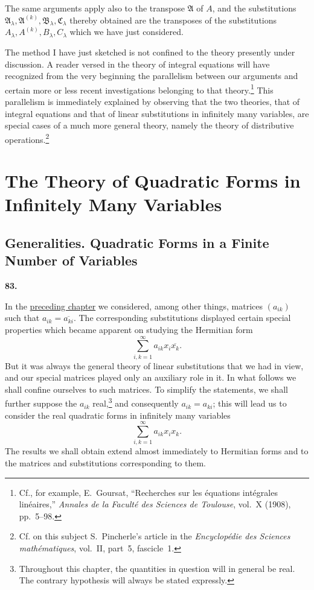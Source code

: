 \documentclass[
  paper=b5,
  fontsize=13pt,
  twoside=true,
  open=any,
  bookmarkpackage=false,
  chapterprefix=true,
  headings=normal
]{scrbook}
\theoremstyle{definition}
\newcommand{\numberedparagraph}[1]{%
  \par\medskip\phantomsection\label{sec:#1}%
  \noindent\textbf{#1.}\enspace
}
\begin{document}
The same arguments apply also to the transpose \(\mathfrak A\) of \(A\), and the
substitutions \(\mathfrak A_\lambda,\mathfrak A^{(k)},\mathfrak B_\lambda,
\mathfrak C_\lambda\) thereby obtained are the transposes of the substitutions
\(A_\lambda,A^{(k)},B_\lambda,C_\lambda\) which we have just considered.

The method I have just sketched is not confined to the theory presently under
discussion.  A reader versed in the theory of integral equations will have
recognized from the very beginning the parallelism between our arguments and
certain more or less recent investigations belonging to that theory.\footnote{Cf.,
for example, E.~Goursat, ``Recherches sur les équations intégrales linéaires,''
\emph{Annales de la Faculté des Sciences de Toulouse}, vol.~X (1908), pp.~5--98.}
This parallelism is immediately explained by observing that the two theories,
that of integral equations and that of linear substitutions in infinitely many
variables, are special cases of a much more general theory, namely the theory of
distributive operations.\footnote{Cf. on this subject S.~Pincherle's article in
the \emph{Encyclopédie des Sciences mathématiques}, vol.~II, part~5, fascicle~1.}

\chapter{The Theory of Quadratic Forms in Infinitely Many Variables}\label{chap:5}

\section{Generalities. Quadratic Forms in a Finite Number of Variables}

\numberedparagraph{83}
In the \hyperref[chap:4]{preceding chapter} we considered, among other things, matrices
\((a_{ik})\) such that \(a_{ik}=\overline{a_{ki}}\).  The corresponding
substitutions displayed certain special properties which became apparent on
studying the Hermitian form
\[
  \sum_{i,k=1}^{\infty} a_{ik}x_i\overline{x_k}.
\]
But it was always the general theory of linear substitutions that we had in
view, and our special matrices played only an auxiliary role in it.  In what
follows we shall confine ourselves to such matrices.  To simplify the
statements, we shall further suppose the \(a_{ik}\) real,\footnote{Throughout
this chapter, the quantities in question will in general be real.  The contrary
hypothesis will always be stated expressly.} and consequently
\(a_{ik}=a_{ki}\); this will lead us to consider the real quadratic forms in
infinitely many variables
\[
  \sum_{i,k=1}^{\infty} a_{ik}x_ix_k.
\]
The results we shall obtain extend almost immediately to Hermitian forms and to
the matrices and substitutions corresponding to them.
\end{document}
